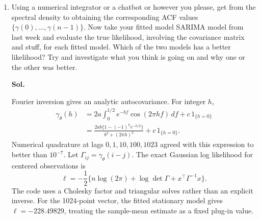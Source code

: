 \documentclass[lang=en,11pt,a4paper,citestyle =authoryear,nobib=true]{elegantpaper}
\begin{document}
\begin{enumerate}[label=\arabic*.,leftmargin=*]
I compute $d_k=n^{-1/2}\sum_{t=0}^{n-1}(X_t-\bar X)e^{-2\pi ikt/n}$
and $I_k=|d_k|^2$. For real data I use only the positive frequencies,
with the real-valued Nyquist coefficient given half weight:
\[
Q(\theta)=\sum_{k=1}^{n/2-1}
\left[\log S_\theta(k/n)+\frac{I_k}{S_\theta(k/n)}\right]
+\frac12\left[\log S_\theta(1/2)+\frac{I_{n/2}}{S_\theta(1/2)}\right].
\]
The zero frequency is excluded after estimating the mean. The DFT time
origin differs from Problem 1 only by a unit-modulus phase and therefore
does not change the periodogram. The two-sided spectrum is not doubled
when only positive frequencies are used in this likelihood.
\begin{lstlisting}[language=Python]
dft = np.fft.fft(series) / np.sqrt(len(series))
parameters, result = fit_spectrum(dft)
\end{lstlisting}
I optimize the log parameters with bounded L-BFGS-B and four initial decay
values. All fitted parameters are positive; the selected optimizer reports
convergence. The fitted spectrum is
\[
\widehat S(f)=13.89572e^{-22.24673|f|}+0.00658014,
\]
with objective $Q=-638.94618$, up to the omitted parameter-independent
likelihood constants. This formula uses cycles per day; coefficients cannot
be transferred unchanged to an angular-frequency density.
For weighted DFT inputs the same function is a Whittle-type approximation;
tapering smooths the expected periodogram and correlates nearby coefficients.
The fit reported here uses the untapered DFT to keep this approximation clear.
\vspace{1em}

\item[$3^*$.] Using a numerical integrator or a chatbot or however you please, get from the spectral density to obtaining the corresponding ACF values $\{\gamma(0),\ldots,\gamma(n-1)\}$. Now take your fitted model SARIMA model from last week and evaluate the true likelihood, involving the covariance matrix and stuff, for each fitted model. Which of the two models has a better likelihood? Try and investigate what you think is going on and why one or the other was better.
\par\vspace{0.5em}\textbf{Sol.}\par

Fourier inversion gives an analytic autocovariance. For integer $h$,
\begin{align*}
\gamma_\theta(h)
&=2a\int_0^{1/2}e^{-bf}\cos(2\pi hf)\,df+c\,1_{\{h=0\}}\\
&=\frac{2ab\{1-(-1)^he^{-b/2}\}}{b^2+(2\pi h)^2}
+c\,1_{\{h=0\}}.
\end{align*}
Numerical quadrature at lags $0,1,10,100,1023$ agreed with this expression
to better than $10^{-7}$. Let $\Gamma_{ij}=\gamma_\theta(i-j)$.
The exact Gaussian log likelihood for centered observations is
\[
\ell=-\frac12\{n\log(2\pi)+\log\det\Gamma+x^\top\Gamma^{-1}x\}.
\]
The code uses a Cholesky factor and triangular solves rather than an explicit
inverse. For the 1024-point vector, the fitted stationary model gives
$\ell=-228.49829$, treating the sample-mean estimate as a fixed plug-in value.


\end{enumerate}
\end{document}
